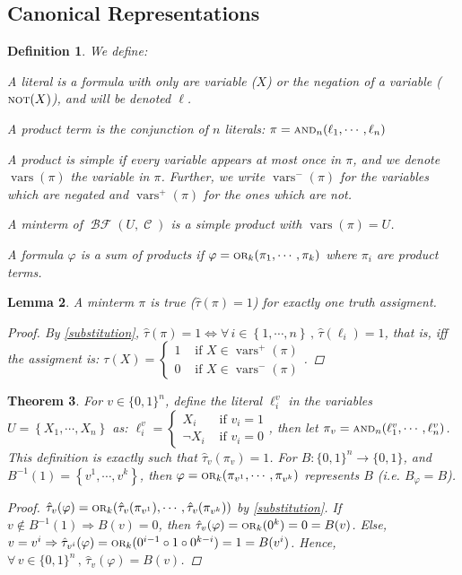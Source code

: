 \documentclass[12pt]{article}
\let\RA\Rightarrow
\let\LR\Leftrightarrow
\newcommand{\Forall}[1]{\forall\,{#1}\,,\,}
\newcommand{\seq}[2][0]{\left\{{#1},\cdots,{#2}\right\}}
\newcommand{\scr}[1]{{\scriptstyle\textup{#1}}}
\DeclareMathOperator{\C}{\mathcal{C}}
\DeclareMathOperator{\BF}{\mathcal{BF}}
\DeclareMathOperator{\NOT}{\scr{NOT}}
\DeclareMathOperator{\OR}{\scr{OR}}
\DeclareMathOperator{\AND}{\scr{AND}}
\newcommand*{\B}{\{0,1\}}
\DeclareMathOperator{\vars}{vars}
\newtheorem{theorem}{Theorem}[subsection]
\newtheorem{definition}[theorem]{Definition}
\newtheorem{lemma}[theorem]{Lemma}
\begin{document}
\pagebreak

\subsection{Canonical Representations}

\begin{definition}
  \label{prod_defs}
  We define: 
  \begin{compactenum}[(i)]
    \item A literal is a formula with only are variable ($X$) or the negation of a variable ($\NOT(X)$), and will be denoted $\ell$.
    \item A product term is the conjunction of $n$ literals: $\pi=\AND_n(\ell_1,\cdots,\ell_n)$
    \item A product is simple if every variable appears at most once in $\pi$, and we denote $\vars(\pi)$ the variable in $\pi$. Further, we write $\vars^-(\pi)$ for the variables which are negated and $\vars^+(\pi)$ for the ones which are not.
    \item A minterm of $\BF(U,\C)$ is a simple product with $\vars(\pi)=U$.
    \item A formula $\varphi$ is a sum of products if $\varphi=\OR_k(\pi_1,\cdots,\pi_k)$ where $\pi_i$ are product terms.
  \end{compactenum}
\end{definition}

\begin{lemma}
  A minterm $\pi$ is true ($\hat{\tau}(\pi)=1$) for exactly one truth assigment.
  \begin{proof}
    By \ref{substitution}, $\hat{\tau}(\pi)=1\LR \Forall{i\in\seq[1]{n}}\hat{\tau}(\ell_i)=1$, that is, iff the assigment is: $\tau(X)=\begin{cases}
      1&\text{ if }X\in\vars^+(\pi)\\
      0&\text{ if }X\in\vars^-(\pi)
    \end{cases}$.
  \end{proof}
\end{lemma}

\begin{theorem}
  For $v\in\B^n$, define the literal $\ell^v_i$ in the variables $U=\seq[X_1]{X_n}$ as: $\ell^v_i=\begin{cases}
    X_i&\text{ if }v_i=1\\
    \neg X_i&\text{ if }v_i=0
  \end{cases}$, then let $\pi_v=\AND_n(\ell^v_1,\cdots,\ell^v_n)$. This definition is exactly such that $\hat{\tau}_v(\pi_v)=1$. For $B:\B^n\to\B$, and $B^{-1}(1)=\seq[v^1]{v^k}$, then $\varphi=\OR_k(\pi_{v^1},\cdots,\pi_{v^k})$ represents $B$ (i.e. $B_\varphi=B$).
  \begin{proof}
    $\hat{\tau}_v(\varphi)=\OR_k(\hat{\tau}_v(\pi_{v^1}),\cdots,\hat{\tau}_v(\pi_{v^k}))$ by \ref{substitution}. If $v\notin B^{-1}(1)\RA B(v)=0$, then $\hat{\tau}_v(\varphi)=\OR_k(0^k)=0=B(v)$. Else, $v=v^i\RA \hat{\tau}_{v^i}(\varphi)=\OR_k(0^{i-1}\circ 1\circ 0^{k-i})=1=B(v^i)$. Hence, $\Forall{v\in\B^n}\hat{\tau}_v(\varphi)=B(v)$.
  \end{proof}
\end{theorem}
\end{document}
